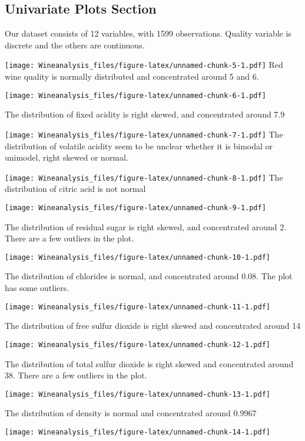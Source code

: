 \documentclass[]{article}
\begin{document}
\subsection{Univariate Plots Section}\label{univariate-plots-section}

Our dataset consists of 12 variables, with 1599 observations. Quality
variable is discrete and the others are continuous.

\texttt{[image: Wineanalysis\_files/figure-latex/unnamed-chunk-5-1.pdf]}
Red wine quality is normally distributed and concentrated around 5 and
6.

\texttt{[image: Wineanalysis\_files/figure-latex/unnamed-chunk-6-1.pdf]}

The distribution of fixed acidity is right skewed, and concentrated
around 7.9

\texttt{[image: Wineanalysis\_files/figure-latex/unnamed-chunk-7-1.pdf]}
The distribution of volatile acidity seem to be unclear whether it is
bimodal or unimodel, right skewed or normal.

\texttt{[image: Wineanalysis\_files/figure-latex/unnamed-chunk-8-1.pdf]}
The distribution of citric acid is not normal

\texttt{[image: Wineanalysis\_files/figure-latex/unnamed-chunk-9-1.pdf]}

The distribution of residual sugar is right skewed, and concentrated
around 2. There are a few outliers in the plot.

\texttt{[image: Wineanalysis\_files/figure-latex/unnamed-chunk-10-1.pdf]}

The distribution of chlorides is normal, and concentrated around 0.08.
The plot has some outliers.

\texttt{[image: Wineanalysis\_files/figure-latex/unnamed-chunk-11-1.pdf]}

The distribution of free sulfur dioxide is right skewed and concentrated
around 14

\texttt{[image: Wineanalysis\_files/figure-latex/unnamed-chunk-12-1.pdf]}

The distribution of total sulfur dioxide is right skewed and
concentrated around 38. There are a few outliers in the plot.

\texttt{[image: Wineanalysis\_files/figure-latex/unnamed-chunk-13-1.pdf]}

The distribution of density is normal and concentrated around 0.9967

\texttt{[image: Wineanalysis\_files/figure-latex/unnamed-chunk-14-1.pdf]}
\end{document}
